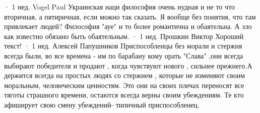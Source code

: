 \begin{itemize}
 · 1 нед.
Vogel Paul
Украинская наци философия очень нудная и не то что вторичная, а пятиричная, если можно так сказать. Я вообще без понятия, что там привлекает людей? Философия "ауе" и то более романтична и обаятельна. А зло как известно обязано быть обаятельным.
 · 1 нед.
Прошкин Виктор
Хороший текст!
 · 1 нед.
Алексей Папушников
Приспособленцы без морали и стержня всегда были, во все времена - им по барабану кому орать "Слава" ,они всегда выбирают победителя и продают , когда чувствуют нового , сильнее прежнего.А держится всегда на простых людях со стержнем , которые не изменяют своим моральным, человеческим ценностям. Это они на своих плечах переносят все тяготы страшного времени, остаются всегда верны своим убеждениям. Те кто афиширует свою смену убеждений- типичный приспособленец.

\end{itemize} %
